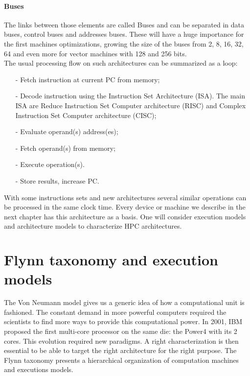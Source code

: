 \paragraph{Buses}
The links between those elements are called Buses and can be separated in data buses, control buses and addresses buses.
These will have a huge importance for the first machines optimizations, growing the size of the buses from 2, 8, 16, 32, 64 and even more for vector machines with 128 and 256 bits.\\

The usual processing flow on such architectures can be summarized as a loop: 
\begin{itemize}[noitemsep,nolistsep]
\item[-] Fetch instruction at current PC from memory;
\item[-] Decode instruction using the Instruction Set Architecture (ISA). The main ISA are Reduce Instruction Set Computer architecture (RISC) and Complex Instruction Set Computer architecture (CISC);
\item[-] Evaluate operand(s) address(es);
\item[-] Fetch operand(s) from memory;
\item[-] Execute operation(s).
\item[-] Store results, increase PC.\\
\end{itemize}

With some instructions sets and new architectures several similar operations can be processed in the same clock time.
Every device or machine we describe in the next chapter has this architecture as a basis. 
One will consider execution models and architecture models to characterize HPC architectures.

\section{Flynn taxonomy and execution models}
The Von Neumann model gives us a generic idea of how a computational unit is fashioned. 
The constant demand in more powerful computers required the scientists to find more ways to provide this computational power.
In 2001, IBM proposed the first multi-core processor on the same die: the Power4 with its 2 cores.
This evolution required new paradigms.
A right characterization is then essential to be able to target the right architecture for the right purpose. 
The Flynn taxonomy presents a hierarchical organization of computation machines and executions models.

